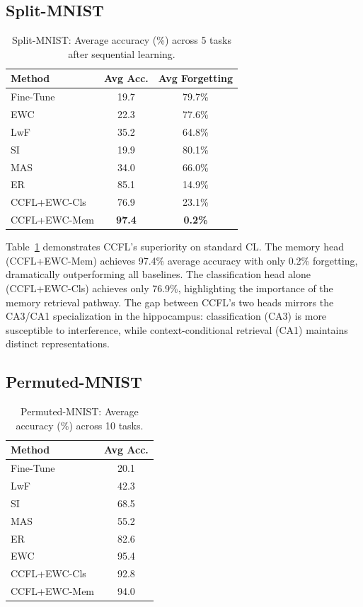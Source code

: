 \documentclass[letterpaper, 10pt, times]{article}
\begin{document}
\subsection{Split-MNIST}

\begin{table}[t]
\centering
\caption{Split-MNIST: Average accuracy (\%) across 5 tasks after sequential learning.}
\label{tab:split}
\begin{tabular}{lcc}
\toprule
Method & Avg Acc. & Avg Forgetting \\
\midrule
Fine-Tune & 19.7 & 79.7\% \\
EWC & 22.3 & 77.6\% \\
LwF & 35.2 & 64.8\% \\
SI & 19.9 & 80.1\% \\
MAS & 34.0 & 66.0\% \\
ER & 85.1 & 14.9\% \\
\midrule
CCFL+EWC-Cls & 76.9 & 23.1\% \\
CCFL+EWC-Mem & \textbf{97.4} & \textbf{0.2\%} \\
\bottomrule
\end{tabular}
\end{table}

Table~\ref{tab:split} demonstrates CCFL's superiority on standard CL. The memory head (CCFL+EWC-Mem) achieves 97.4\% average accuracy with only 0.2\% forgetting, dramatically outperforming all baselines. The classification head alone (CCFL+EWC-Cls) achieves only 76.9\%, highlighting the importance of the memory retrieval pathway. The gap between CCFL's two heads mirrors the CA3/CA1 specialization in the hippocampus: classification (CA3) is more susceptible to interference, while context-conditional retrieval (CA1) maintains distinct representations.

\subsection{Permuted-MNIST}

\begin{table}[t]
\centering
\caption{Permuted-MNIST: Average accuracy (\%) across 10 tasks.}
\label{tab:permuted}
\begin{tabular}{lc}
\toprule
Method & Avg Acc. \\
\midrule
Fine-Tune & 20.1 \\
LwF & 42.3 \\
SI & 68.5 \\
MAS & 55.2 \\
ER & 82.6 \\
EWC & 95.4 \\
\midrule
CCFL+EWC-Cls & 92.8 \\
CCFL+EWC-Mem & 94.0 \\
\bottomrule
\end{tabular}
\end{table}
\end{document}

